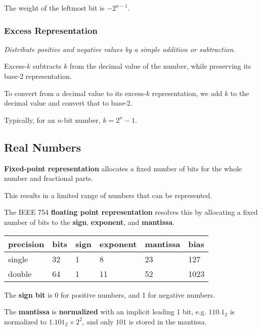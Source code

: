 The weight of the leftmost bit is $-2^{n-1}$.

\subsubsection{Excess Representation}
\emph{Distribute positive and negative values by a simple addition or subtraction.}

Excess-$k$ subtracts $k$ from the decimal value of the number, while preserving its base-2 representation.

To convert from a decimal value to its excess-$k$ representation, we add $k$ to the decimal value and convert that to base-2.

Typically, for an $n$-bit number, $k = 2^n - 1$.

\subsection{Real Numbers}

\textbf{Fixed-point representation} allocates a fixed number of bits for the whole number and fractional parts.

This results in a limited range of numbers that can be represented.

The IEEE 754 \textbf{floating point representation} resolves this by allocating a fixed number of bits to the
\textbf{sign}, \textbf{exponent}, and \textbf{mantissa}.

\begin{tabular}{l|l|l|l|l|l}
    precision & bits & sign & exponent & mantissa & bias \\\hline
    single & 32 & 1 & 8 & 23 & 127 \\
    double & 64 & 1 & 11 & 52 & 1023 \\
\end{tabular}

The \textbf{sign bit} is 0 for positive numbers, and 1 for negative numbers.

The \textbf{mantissa} is \textbf{normalized} with an implicit leading 1 bit, e.g. $110.1_2$ is normalized to
$1.101_2 \times 2^2$, and only $101$ is stored in the mantissa.